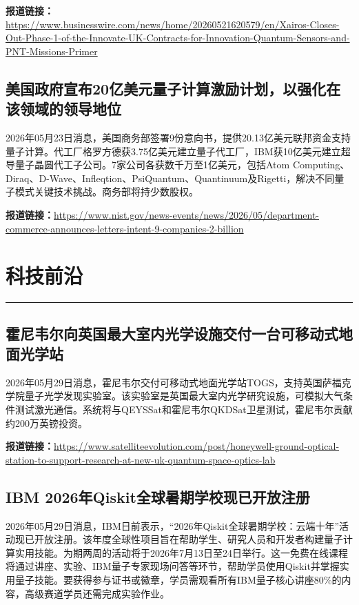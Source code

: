 \documentclass[12pt,a4paper]{ctexart}
\begin{document}
\noindent\textbf{报道链接：}\url{https://www.businesswire.com/news/home/20260521620579/en/Xairos-Closes-Out-Phase-1-of-the-Innovate-UK-Contracts-for-Innovation-Quantum-Sensors-and-PNT-Missions-Primer}

\subsection{ 美国政府宣布20亿美元量子计算激励计划，以强化在该领域的领导地位 }

2026年05月23日消息，美国商务部签署9份意向书，提供20.13亿美元联邦资金支持量子计算。代工厂格罗方德获3.75亿美元建立量子代工厂，IBM获10亿美元建立超导量子晶圆代工子公司。7家公司各获数千万至1亿美元，包括Atom Computing、Diraq、D-Wave、Infleqtion、PsiQuantum、Quantinuum及Rigetti，解决不同量子模式关键技术挑战。商务部将持少数股权。

\noindent\textbf{报道链接：}\url{https://www.nist.gov/news-events/news/2026/05/department-commerce-announces-letters-intent-9-companies-2-billion}


\newpage
\section{科技前沿}
\vspace{-0.5em}
\noindent\rule{\linewidth}{1.5pt}

\subsection{ 霍尼韦尔向英国最大室内光学设施交付一台可移动式地面光学站 }

2026年05月29日消息，霍尼韦尔交付可移动式地面光学站TOGS，支持英国萨福克学院量子光学发现实验室。该实验室是英国最大室内光学研究设施，可模拟大气条件测试激光通信。系统将与QEYSSat和霍尼韦尔QKDSat卫星测试，霍尼韦尔贡献约200万英镑投资。

\noindent\textbf{报道链接：}\url{https://www.satelliteevolution.com/post/honeywell-ground-optical-station-to-support-research-at-new-uk-quantum-space-optics-lab}

\subsection{ IBM 2026年Qiskit全球暑期学校现已开放注册 }

2026年05月29日消息，IBM日前表示，“2026年Qiskit全球暑期学校：云端十年”活动现已开放注册。该年度全球性项目旨在帮助学生、研究人员和开发者构建量子计算实用技能。为期两周的活动将于2026年7月13日至24日举行。这一免费在线课程将通过讲座、实验、IBM量子专家现场问答等环节，帮助学员使用Qiskit并掌握实用量子技能。要获得参与证书或徽章，学员需观看所有IBM量子核心讲座80\%的内容，高级赛道学员还需完成实验作业。
\end{document}

